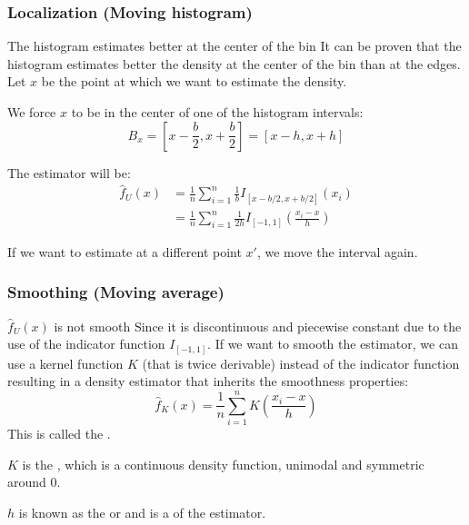 \subsubsection{Localization (Moving histogram)}
\begin{prop}{The histogram estimates better at the center of the bin}{}
	It can be proven that the histogram estimates better the density at the center of the
	bin than at the edges.
	\tcblower
	Let $x$ be the point at which we want to estimate the density.

	We force $x$ to be in the center of one of the histogram intervals:
	\begin{equation*}
		B_x = \left[ x - \frac{b}{2}, x + \frac{b}{2} \right] = [ x - h, x + h ]
	\end{equation*}

	The estimator will be:
	\begin{align*}
		\widehat{f}_U(x) & = \frac{1}{n}\sum_{i=1}^n \frac{1}{b} I_{[x - b/2, x + b/2]}(x_i)                  \\
		                 & = \frac{1}{n}\sum_{i=1}^n \frac{1}{2h} I_{[-1, 1]}\left( \frac{x_i - x}{h} \right)
	\end{align*}

	If we want to estimate at a different point $x'$, we move the interval again.
\end{prop}

\subsubsection{Smoothing (Moving average)}
\begin{prop}{$\widehat{f}_U(x)$ is not smooth}{}
	Since it is discontinuous and piecewise constant due to the use of the indicator
	function $I_{[-1,1]}$.
	\tcblower
	If we want to smooth the estimator, we can use a kernel function $K$ (that is twice derivable) instead
	of the indicator function resulting in a density estimator that inherits the
	smoothness properties:
	\begin{equation}
		\widehat{f}_K(x) = \frac{1}{n}\sum_{i=1}^n K\left( \frac{x_i - x}{h} \right)
		\tag{kernel density estimator}
	\end{equation}
	This is called the .

	$K$ is the , which is a continuous density function, unimodal
	and symmetric around $0$.

	$h$ is known as the  or  and is a
	 of the estimator.
\end{prop}

